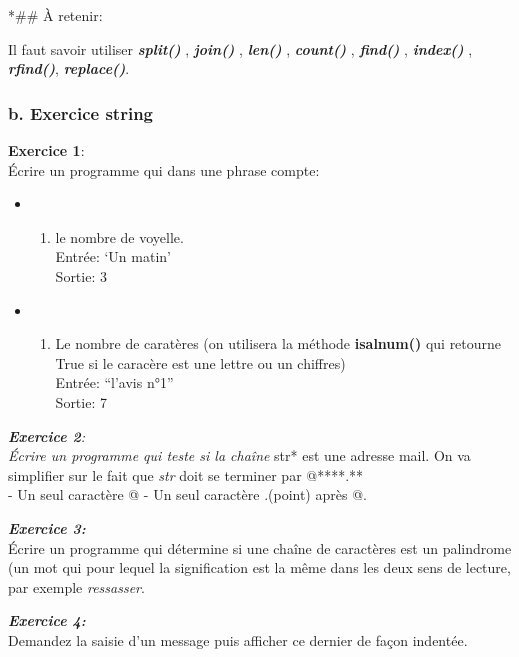 \documentclass{article}
\begin{document}
    *\#\# À retenir:

Il faut savoir utiliser \textbf{\emph{split()}} , \textbf{\emph{join()}}
, \textbf{\emph{len()}} , \textbf{\emph{count()}} ,
\textbf{\emph{find()}} , \textbf{\emph{index()}} ,
\textbf{\emph{rfind()}}, \textbf{\emph{replace()}}.

\subsubsection{b. Exercice string}\label{b.-exercice-string}

\textbf{Exercice 1}:\\Écrire un programme qui dans une phrase compte:

\begin{itemize}
\item
  \begin{enumerate}
  \def\labelenumi{\alph{enumi})}
  \itemsep1pt\parskip0pt
  \item
    le nombre de voyelle.\\ Entrée: `Un matin'\\ Sortie: 3
  \end{enumerate}
\item
  \begin{enumerate}
  \def\labelenumi{\alph{enumi})}
  \setcounter{enumi}{1}
  \itemsep1pt\parskip0pt
  \item
    Le nombre de caratères (on utilisera la méthode \textbf{isalnum()}
    qui retourne True si le caracère est une lettre ou un chiffres)\\
    Entrée: ``l'avis n°1''\\ Sortie: 7
  \end{enumerate}
\end{itemize}

    \emph{\textbf{Exercice 2}:\\Écrire un programme qui teste si la chaîne
}str* est une adresse mail. On va simplifier sur le fait que \emph{str}
doit se terminer par @****.**\\- Un seul caractère @ - Un seul caractère
.(point) après @.

    \textbf{\emph{Exercice 3:}}\\Écrire un programme qui détermine si une
chaîne de caractères est un palindrome (un mot qui pour lequel la
signification est la même dans les deux sens de lecture, par exemple
\emph{ressasser}.

    \textbf{\emph{Exercice 4:}}\\Demandez la saisie d'un message puis
afficher ce dernier de façon indentée.
\end{document}

